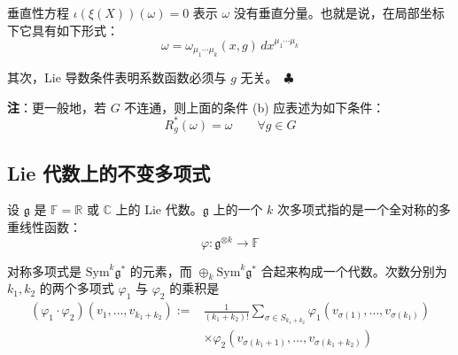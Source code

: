 垂直性方程 $\iota(\xi(X))(\omega)=0$ 表示 $\omega$ 没有垂直分量。也就是说，在局部坐标下它具有如下形式：
\begin{equation}
  \omega = \omega_{\mu_1\cdots\mu_k}(x,g)\,dx^{\mu_1\cdots\mu_k}
  \tag{I.2}
  \label{eq:I.2}
\end{equation}

其次，Lie 导数条件表明系数函数必须与 $g$ 无关。\ $\clubsuit$


\textbf{注}：更一般地，若 $G$ 不连通，则上面的条件 (b) 应表述为如下条件：
\begin{equation}
  R_g^*(\omega)=\omega \qquad \forall g\in G
  \tag{I.3}
  \label{eq:I.3}
\end{equation}

\subsection{Lie 代数上的不变多项式} %

设 $\mathfrak{g}$ 是 $\mathbb{F}=\mathbb{R}$ 或 $\mathbb{C}$ 上的 Lie 代数。$\mathfrak{g}$ 上的一个 $k$ 次多项式指的是一个全对称的多重线性函数：
\begin{equation}
  \varphi:\mathfrak{g}^{\otimes k}\to\mathbb{F}
  \tag{I.4}
  \label{eq:I.4}
\end{equation}

对称多项式是 $\mathrm{Sym}^k\mathfrak{g}^*$ 的元素，而 $\oplus_k\mathrm{Sym}^k\mathfrak{g}^*$ 合起来构成一个代数。次数分别为 $k_1,k_2$ 的两个多项式 $\varphi_1$ 与 $\varphi_2$ 的乘积是
\begin{equation}
\begin{aligned}
  (\varphi_1\cdot\varphi_2)(v_1,\dots,v_{k_1+k_2}) :={}&
    \frac{1}{(k_1+k_2)!}\sum_{\sigma\in S_{k_1+k_2}}
    \varphi_1(v_{\sigma(1)},\dots,v_{\sigma(k_1)})\\
  &\times \varphi_2(v_{\sigma(k_1+1)},\dots,v_{\sigma(k_1+k_2)})
\end{aligned}
  \tag{I.5}
  \label{eq:I.5}
\end{equation}

